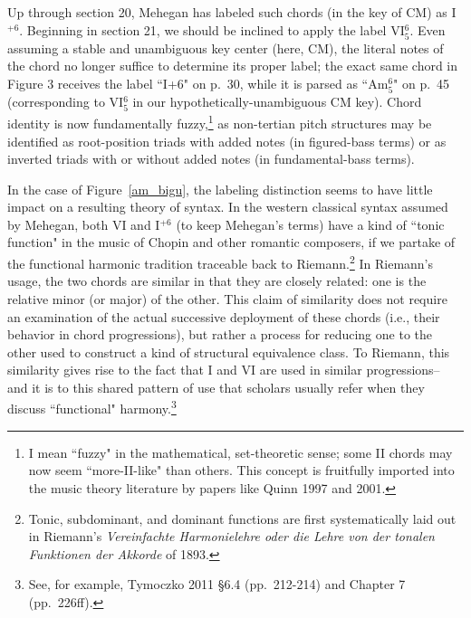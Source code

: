 Up through section 20, Mehegan has labeled such chords (in the key of CM) as I$^{+6}$.  Beginning in section 21, we should be inclined to apply the label VI$^6_5$.  Even assuming a stable and unambiguous key center (here, CM), the literal notes of the chord no longer suffice to determine its proper label; the exact same chord in Figure 3 receives the label ``I+6" on p.\ 30, while it is parsed as ``Am$^6_5$" on p.\ 45 (corresponding to VI$^6_5$ in our hypothetically-unambiguous CM key).  Chord identity is now fundamentally fuzzy,\footnote{I mean ``fuzzy" in the mathematical, set-theoretic sense; some II chords may now seem ``more-II-like" than others.  This concept is fruitfully imported into the music theory literature by papers like Quinn 1997 and 2001.} as non-tertian pitch structures may be identified as root-position triads with added notes (in figured-bass terms) or as inverted triads with or without added notes (in fundamental-bass terms).

In the case of Figure~\ref{am_bigu}, the labeling distinction seems to have little impact on a resulting theory of syntax.  In the western classical syntax assumed by Mehegan, both VI and I$^{+6}$ (to keep Mehegan's terms) have a kind of ``tonic function" in the music of Chopin and other romantic composers, if we partake of the functional harmonic tradition traceable back to Riemann.\footnote{Tonic, subdominant, and dominant functions are first systematically laid out in Riemann's \emph{Vereinfachte Harmonielehre oder die Lehre von der tonalen Funktionen der Akkorde} of 1893.}  In Riemann's usage, the two chords are similar in that they are closely related: one is the relative minor (or major) of the other.  This claim of similarity does not require an examination of the actual successive deployment of these chords (i.e., their behavior in chord progressions), but rather a process for reducing one to the other used to construct a kind of structural equivalence class.  To Riemann, this similarity gives rise to the fact that I and VI are used in similar progressions-- and it is to this shared pattern of use that scholars usually refer when they discuss ``functional" harmony.\footnote{See, for example, Tymoczko 2011 \S 6.4 (pp.\ 212-214) and Chapter 7 (pp.\ 226ff).}  

